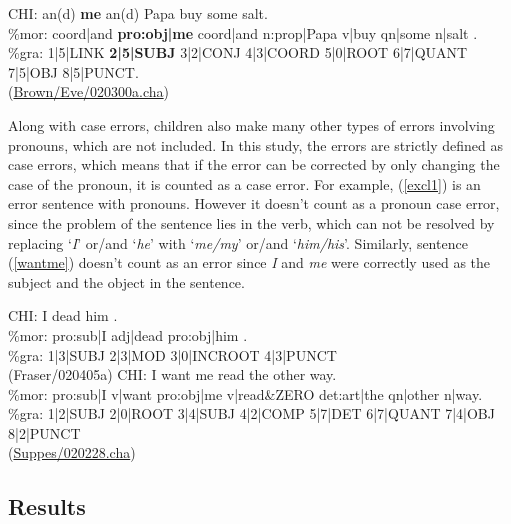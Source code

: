 \begin{exe}
\ex \label{conjoined} \gll *CHI: an(d) \textbf{me} an(d) Papa buy some salt.\\
\%mor: coord|and \textbf{pro:obj|me} coord|and n:prop|Papa v|buy qn|some n|salt .\\
\%gra: 1|5|LINK \textbf{2|5|SUBJ} 3|2|CONJ 4|3|COORD 5|0|ROOT 6|7|QUANT 7|5|OBJ 8|5|PUNCT.\\
(\href{https://childes.talkbank.org/browser/index.php?url=Eng-NA/Brown/Eve/020300a.cha}{Brown/Eve/020300a.cha})
\end{exe}
Along with case errors, children also make many other types of errors involving pronouns, which are not included. In this study, the errors are strictly defined as case errors, which means that if the error can be corrected by only changing the case of the pronoun, it is counted as a case error. For example, (\ref{excl1}) is an error sentence with pronouns. However it doesn't count as a pronoun case error, since the problem of the sentence lies in the verb, which can not be resolved by replacing `\textit{I}' or/and `\textit{he}' with `\textit{me/my}' or/and `\textit{him/his}'. Similarly, sentence (\ref{wantme}) doesn't count as an error since \textit{I} and \textit{me} were correctly used as the subject and the object in the sentence. 
\begin{exe}
\ex \label{excl1} \gll *CHI:	I dead him .\\
\%mor:	pro:sub|I adj|dead pro:obj|him .\\
\%gra:	1|3|SUBJ 2|3|MOD 3|0|INCROOT 4|3|PUNCT\\ 
(Fraser/020405a)
\ex \label{wantme} \gll *CHI: I want me read the other way. \\
\%mor: pro:sub|I v|want pro:obj|me v|read&ZERO det:art|the qn|other n|way.\\
\%gra: 1|2|SUBJ 2|0|ROOT 3|4|SUBJ 4|2|COMP 5|7|DET 6|7|QUANT 7|4|OBJ 8|2|PUNCT\\
(\href{https://childes.talkbank.org/browser/index.php?url=Eng-NA/Suppes/020228.cha}{Suppes/020228.cha})
\end{exe}

\subsection{Results}
